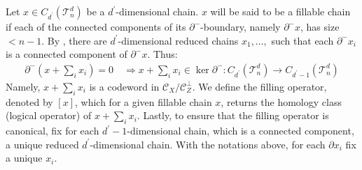 \begin{definition}
  \label{def:connsyn}
Let $x \in C_{d^{\prime}}(\mathcal{T}_n^d)$ be a $d^{\prime}$-dimensional chain. $x$ will be said to be a fillable chain if each of the connected components of its $\partial^{-}$-boundary, namely $\partial^{-} x$, has size $< n - 1$. By , there are $d^{\prime}$-dimensional reduced chains $x_{1}, \ldots,$ such that each $\partial^{-}x_{i}$ is a connected component of $\partial^{-}x$. Thus:
    \begin{equation*}
      \begin{split}
      \partial^{-} (x + \sum_{i}x_{i}) = 0  \quad \Rightarrow x + \sum_{i}x_{i} \in \ker \partial^{-} \colon C_{d^{\prime}}(\mathcal{T}_n^d) \rightarrow C_{d^{\prime}-1}(\mathcal{T}_n^d)
    \end{split}
  \end{equation*}
  Namely, $x + \sum_{i}x_{i}$ is a codeword in $\mathcal{C}_{X}/ \mathcal{C}_{Z}^{\perp}$. We define the filling operator, denoted by $[x]$, which for a given fillable chain $x$, returns the homology class (logical operator) of $x + \sum_{i}x_{i}$. Lastly, to ensure that the filling operator is canonical, fix for each $d^{\prime}-1$-dimensional chain, which is a connected component, a unique reduced $d^{\prime}$-dimensional chain. With the notations above, for each $\partial x_{i}$ fix a unique $x_{i}$.
\end{definition}


